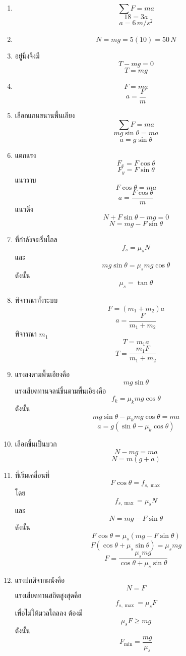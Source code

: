 \begin{enumerate}
    \item
    \[
    \sum F=ma
    \]
    \[
    18=3a
    \]
    \[
    a=6\,\si{m/s^2}
    \]

    \item
    \[
    N=mg=5(10)=50\,\si{N}
    \]

    \item
    อยู่นิ่งจึงมี
    \[
    T-mg=0
    \]
    \[
    T=mg
    \]

    \item
    \[
    F=ma
    \]
    \[
    a=\frac{F}{m}
    \]

    \item
    เลือกแกนขนานพื้นเอียง
    \[
    \sum F=ma
    \]
    \[
    mg\sin\theta=ma
    \]
    \[
    a=g\sin\theta
    \]

    \item
    แตกแรง
    \[
    F_x=F\cos\theta
    \]
    \[
    F_y=F\sin\theta
    \]
    แนวราบ
    \[
    F\cos\theta=ma
    \]
    \[
    a=\frac{F\cos\theta}{m}
    \]
    แนวดิ่ง
    \[
    N+F\sin\theta-mg=0
    \]
    \[
    N=mg-F\sin\theta
    \]

    \item
    ที่กำลังจะเริ่มไถล
    \[
    f_s=\mu_sN
    \]
    และ
    \[
    mg\sin\theta=\mu_smg\cos\theta
    \]
    ดังนั้น
    \[
    \mu_s=\tan\theta
    \]

    \item
    พิจารณาทั้งระบบ
    \[
    F=(m_1+m_2)a
    \]
    \[
    a=\frac{F}{m_1+m_2}
    \]
    พิจารณา $m_1$
    \[
    T=m_1a
    \]
    \[
    T=\frac{m_1F}{m_1+m_2}
    \]

    \item
    แรงลงตามพื้นเอียงคือ
    \[
    mg\sin\theta
    \]
    แรงเสียดทานจลน์ขึ้นตามพื้นเอียงคือ
    \[
    f_k=\mu_kmg\cos\theta
    \]
    ดังนั้น
    \[
    mg\sin\theta-\mu_kmg\cos\theta=ma
    \]
    \[
    a=g(\sin\theta-\mu_k\cos\theta)
    \]

    \item
    เลือกขึ้นเป็นบวก
    \[
    N-mg=ma
    \]
    \[
    N=m(g+a)
    \]

    \item
    ที่เริ่มเคลื่อนที่
    \[
    F\cos\theta=f_{s,\max}
    \]
    โดย
    \[
    f_{s,\max}=\mu_sN
    \]
    และ
    \[
    N=mg-F\sin\theta
    \]
    ดังนั้น
    \[
    F\cos\theta=\mu_s(mg-F\sin\theta)
    \]
    \[
    F(\cos\theta+\mu_s\sin\theta)=\mu_smg
    \]
    \[
    F=\frac{\mu_smg}{\cos\theta+\mu_s\sin\theta}
    \]

    \item
    แรงปกติจากผนังคือ
    \[
    N=F
    \]
    แรงเสียดทานสถิตสูงสุดคือ
    \[
    f_{s,\max}=\mu_sF
    \]
    เพื่อไม่ให้มวลไถลลง ต้องมี
    \[
    \mu_sF\geq mg
    \]
    ดังนั้น
    \[
    F_{\min}=\frac{mg}{\mu_s}
    \]
\end{enumerate}

